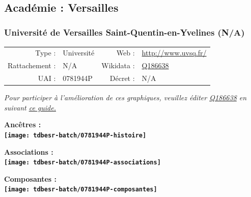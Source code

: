 \documentclass[12pt,french,]{article}
\begin{document}
\ifoddpage \fi ~\newpage  

\hypertarget{acaduxe9mie-versailles}{%
\subsection{Académie : Versailles}\label{acaduxe9mie-versailles}}

\hypertarget{universituxe9-de-versailles-saint-quentin-en-yvelines-na}{%
\subsubsection{Université de Versailles Saint-Quentin-en-Yvelines
(N/A)}\label{universituxe9-de-versailles-saint-quentin-en-yvelines-na}}

\begin{tabular*}{\textwidth}{rp{5cm}rl}  
\hline  
Type : & Université & Web : &\href{http://www.uvsq.fr/}{http://www.uvsq.fr/} \\  
Rattachement : & N/A & Wikidata : & \href{https://www.wikidata.org/entity/Q186638}{Q186638} \\  
UAI : & 0781944P & Décret : & N/A \\  
\hline  
\end{tabular*}

\textit{\scriptsize Pour participer à l'amélioration de ces graphiques, veuillez éditer  \href{https://www.wikidata.org/entity/Q186638}{Q186638}  en suivant \href{https://github.com/cpesr/wikidataESR/blob/master/Rmd/wikidataESR.md}{ce guide.}}

\vspace{1cm}  
\begin{minipage}[b]{0.50\textwidth}\begin{center} \bf Ancêtres : \\  
\texttt{[image: tdbesr-batch/0781944P-histoire]} \end{center}\end{minipage}\begin{minipage}[b]{0.50\textwidth}\begin{center} \bf Associations : \\  
\texttt{[image: tdbesr-batch/0781944P-associations]} \end{center}\end{minipage}

\hrulefill

\begin{center} \bf Composantes : \\  
\texttt{[image: tdbesr-batch/0781944P-composantes]} \end{center}
\end{document}
